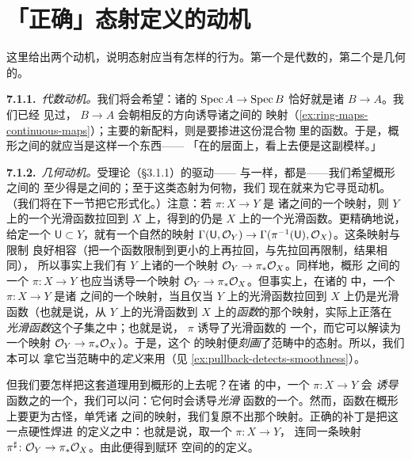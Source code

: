 
\section{「正确」态射定义的动机}

这里给出两个动机，说明态射应当有怎样的行为。第一个是代数的，第二个是几何的。

\textbf{7.1.1.}\ \emph{代数动机。}\quad 我们将会希望：诸\trAffineScheme{}的%
\trMorphism{} $\operatorname{Spec} A\to\operatorname{Spec} B$ 恰好就是诸\trRingMorphism{} $B\to A$。我们已经%
见过，\trRingMorphism{} $B\to A$ 会朝相反的方向诱导诸\trTopologicalSpace{}之间的%
映射（\cref{ex:ring-maps-continuous-maps}）；主要的新配料，则是要掺进这份混合物%
里的函数\trStructureSheaf。于是，概形之间的\trMorphism{}就应当是这样一个东西——%
「在\trAffine\trOpenSet{}的层面上，看上去便是这副模样。」

\textbf{7.1.2.}\ \emph{几何动机。}\quad 受\trManifold{}理论（\S3.1.1）的驱动——%
\trManifold{}与\trScheme{}一样，都是\trRingedSpace——我们希望概形之间的%
\trMorphism{}至少得是\trRingedSpace{}之间的\trMorphism；至于这类态射为何物，我们%
现在就来为它寻觅动机。（我们将在下一节把它形式化。）注意：若 $\pi\colon X\to Y$ 是%
诸\trDifferentiable\trManifold{}之间的一个映射，则 $Y$ 上的一个光滑函数拉回到
$X$ 上，得到的仍是 $X$ 上的一个光滑函数。更精确地说，给定一个\trOpenSubset{}
$\mathsf{U}\subset Y$，就有一个自然的映射
$\Gamma(\mathsf{U},\mathcal{O}_Y)\to\Gamma(\pi^{-1}(\mathsf{U}),\mathcal{O}_X)$。这条映射与限制%
良好相容（把一个函数限制到更小的\trOpenSet{}上再拉回，与先拉回再限制，结果相同），
所以事实上我们有 $Y$ 上诸\trSheaf{}的一个映射 $\mathcal{O}_Y\to\pi_*\mathcal{O}_X$。同样地，概形%
之间的一个\trMorphism{} $\pi\colon X\to Y$ 也应当诱导一个映射
$\mathcal{O}_Y\to\pi_*\mathcal{O}_X$。但事实上，在诸\trDifferentiable\trManifold{}的\trCategory{}%
中，一个\trContinuousMap{} $\pi\colon X\to Y$ 是诸\trDifferentiable\trManifold{}%
之间的一个映射，当且仅当 $Y$ 上的光滑函数拉回到 $X$ 上仍是光滑函数（也就是说，从
$Y$ 上的光滑函数到 $X$ 上的\emph{函数}的那个\trPullback{}映射，实际上正落在%
\emph{光滑函数}这个子集之中；也就是说，\trContinuousMap{} $\pi$ 诱导了光滑函数的%
一个\trPullback，而它可以解读为一个映射 $\mathcal{O}_Y\to\pi_*\mathcal{O}_X$）。于是，这个%
\trSheaf{}的映射便\emph{刻画}了\trDifferentiable{}范畴中的态射。所以，我们本可以%
拿它当\trDifferentiable{}范畴中\trMorphism{}的\emph{定义}来用（见%
\cref{ex:pullback-detects-smoothness}）。

但我们要怎样把这套道理用到概形的\trCategory{}上去呢？在诸\trDifferentiable%
\trManifold{}的\trCategory{}中，一个\trContinuousMap{} $\pi\colon X\to Y$ 会%
\emph{诱导}函数之\trSheaf{}的一个\trPullback，我们可以问：它何时会诱导\emph{光滑}%
函数的一个\trPullback。然而，函数在概形上要更为古怪，单凭诸\trTopologicalSpace{}%
之间的映射，我们复原不出那个\trPullback{}映射。正确的补丁是把这一点硬性焊进%
\trMorphism{}的定义之中：也就是说，取一个\trContinuousMap{} $\pi\colon X\to Y$，
连同一条\trPullback{}映射 $\pi^{\sharp}\colon\mathcal{O}_Y\to\pi_*\mathcal{O}_X$。由此便得到赋环%
空间的\emph{\trCategory}的定义。

